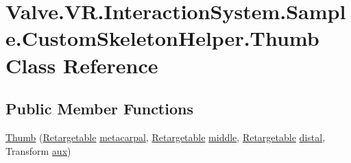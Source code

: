 \hypertarget{class_valve_1_1_v_r_1_1_interaction_system_1_1_sample_1_1_custom_skeleton_helper_1_1_thumb}{}\section{Valve.\+V\+R.\+Interaction\+System.\+Sample.\+Custom\+Skeleton\+Helper.\+Thumb Class Reference}
\label{class_valve_1_1_v_r_1_1_interaction_system_1_1_sample_1_1_custom_skeleton_helper_1_1_thumb}
\subsection*{Public Member Functions}
\begin{DoxyCompactItemize}
\item 
\mbox{\hyperlink{class_valve_1_1_v_r_1_1_interaction_system_1_1_sample_1_1_custom_skeleton_helper_1_1_thumb_ac49e4c7464e3acbbc0558331012e0e73}{Thumb}} (\mbox{\hyperlink{class_valve_1_1_v_r_1_1_interaction_system_1_1_sample_1_1_custom_skeleton_helper_1_1_retargetable}{Retargetable}} \mbox{\hyperlink{class_valve_1_1_v_r_1_1_interaction_system_1_1_sample_1_1_custom_skeleton_helper_1_1_thumb_ad15d797cab49703ff5591a6f773b2de0}{metacarpal}}, \mbox{\hyperlink{class_valve_1_1_v_r_1_1_interaction_system_1_1_sample_1_1_custom_skeleton_helper_1_1_retargetable}{Retargetable}} \mbox{\hyperlink{class_valve_1_1_v_r_1_1_interaction_system_1_1_sample_1_1_custom_skeleton_helper_1_1_thumb_a35306b823b83e537832d0205016d3d43}{middle}}, \mbox{\hyperlink{class_valve_1_1_v_r_1_1_interaction_system_1_1_sample_1_1_custom_skeleton_helper_1_1_retargetable}{Retargetable}} \mbox{\hyperlink{class_valve_1_1_v_r_1_1_interaction_system_1_1_sample_1_1_custom_skeleton_helper_1_1_thumb_a1d105532ec423af7ee332b7b8e857c8d}{distal}}, Transform \mbox{\hyperlink{class_valve_1_1_v_r_1_1_interaction_system_1_1_sample_1_1_custom_skeleton_helper_1_1_thumb_ab8f9e9e193f6f7dd690395785d47c577}{aux}})
\end{DoxyCompactItemize}
